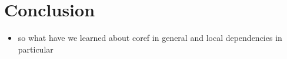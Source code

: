 \documentclass[11pt]{article}
\begin{document}
\section{Conclusion}

\begin{itemize}
\item so what have we learned about coref in general and local dependencies in particular
\end{itemize}
\newpage %
\printbibliography
\end{document}
